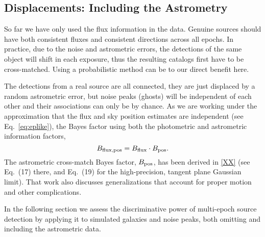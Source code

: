 \documentclass[twocolumn]{emulateapj}
\begin{document}
\subsection{Displacements: Including the Astrometry}
\label{sec:astrom}
\noindent
So far we have only used the flux information in the data. 
Genuine sources should have both consistent fluxes and consistent directions across all epochs.
In practice, due to the noise and astrometric errors, the detections of the same object will shift in each exposure, thus the resulting catalogs first have to be cross-matched. 
Using a probabilistic method can be to our direct benefit here.

The detections from a real source are all connected, they are just displaced by a random astrometric error, but noise peaks (ghosts) will be independent of each other and their associations can only be by chance.
As we are working under the approximation that the flux and sky position estimates are independent (see Eq.~\ref{eq:eplike}), the Bayes factor using both the photometric and astrometric information factors,
%
\begin{equation}
B_{\rm{}flux,pos} = B_{\rm{}flux}\cdot{}B_{\rm{}pos}.
\end{equation}
%
The astrometric cross-match Bayes factor, $B_{\rm{}pos}$, has been derived in \ref{XX} (see Eq.~(17) there, and Eq.~(19) for the high-precision, tangent plane Gaussian limit).
That work also discusses generalizations that account for proper motion and other complications.

In the following section we assess the discriminative power of multi-epoch source detection by applying it to simulated galaxies and noise peaks, both omitting and including the astrometric data.





\end{document}

